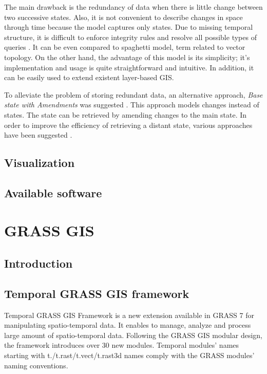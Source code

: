 \documentclass[a4paper,12pt]{book}
\begin{document}
The main drawback is the redundancy of data when there is little change between two successive states.
Also, it is not convenient to describe changes in space through time because the model captures only states.
Due to missing temporal structure, it is difficult to enforce integrity rules
and resolve all possible types of queries \cite{pelekis2004}.
It can be even compared to spaghetti model, term related to vector topology.
On the other hand, the advantage of this model is its simplicity;
it's implementation and usage is quite straightforward and intuitive.
In addition, it can be easily used to extend existent layer-based GIS.

To alleviate the problem of storing redundant data, an alternative approach,
\emph{Base state with Amendments} was suggested \cite{langran1988}.
This approach models changes instead of states.
The state can be retrieved by amending changes to the main state.
In order to improve the efficiency of retrieving a distant state,
various approaches have been suggested \cite{wang2012}.









\section{Visualization}
\section{Available software}

\chapter{GRASS GIS}

\section{Introduction}
\section{Temporal GRASS GIS framework}
Temporal GRASS GIS Framework is a new extension available in GRASS 7 for manipulating spatio-temporal data.
It enables to manage, analyze and process large amount of spatio-temporal data.
Following the GRASS GIS modular design, the framework introduces over 30 new modules.
Temporal modules' names starting with t./t.rast/t.vect/t.rast3d names
comply with the GRASS modules' naming conventions.
\end{document}
